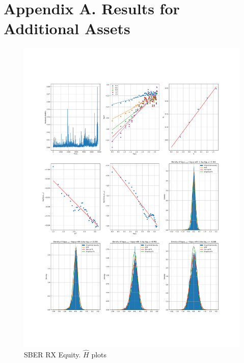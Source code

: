 \section*{Appendix A. Results for Additional Assets}
    \noindent
    \begin{figure}[h]
        \centering
        \includegraphics[width=\textwidth]{fig/SBER RX Equity.pdf}
        \caption{SBER RX Equity. $\hat{H}$ plots}
    \end{figure}

